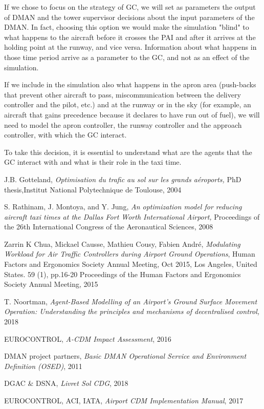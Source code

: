 \documentclass{article}
\begin{document}
If we chose to focus on the strategy of GC, we will set as parameters the output of DMAN and the tower supervisor decisions about the input parameters of the DMAN. 
In fact, choosing this option we would make the simulation "blind" to what happens to the aircraft before it crosses the PAI and after it arrives at the holding point at the runway, and vice versa. Information about what happens in those time period arrive as a parameter to the GC, and not as an effect of the simulation. 

If we include in the simulation also what happens in the apron area (push-backs that prevent other aircraft to pass, miscommunication between the delivery controller and the pilot, etc.) and at the runway or in the sky (for example, an aircraft that gains precedence because it declares to have run out of fuel), we will need to model the apron controller, the runway controller and the approach controller, with which the GC interact. 

To take this decision, it is essential to understand what are the agents that the GC interact with and what is their role in the taxi time.



\begin{thebibliography}{9}
	
	J.B. Gotteland,
	\textit{Optimisation du trafic au sol sur les grands aéroports,}
	PhD thesis,Institut National Polytechnique de Toulouse, 
	2004
	
	S. Rathinam, J. Montoya, and Y. Jung, 
	\textit{An optimization model for reducing aircraft taxi times at the Dallas Fort Worth International Airport,}
	Proceedings of the 26th International Congress of the Aeronautical Sciences, 
	2008
	
	Zarrin  K  Chua,  Mickael  Causse,  Mathieu  Cousy, Fabien  André,
	\textit{Modulating   Workload   for   Air   Traffic   Controllers   during   Airport Ground  Operations},
	Human  Factors  and  Ergonomics  Society Annual Meeting,  Oct  2015,  Los  Angeles,  United  States.  59  (1),  pp.16-20 Proceedings  of  the  Human  Factors  and  Ergonomics  Society  Annual Meeting, 
	2015
	
	T. Noortman,
	\textit{Agent-Based Modelling of an Airport’s Ground Surface Movement Operation: Understanding the principles and mechanisms of decentralised control,}
	2018
	
	EUROCONTROL,
	\textit{A-CDM Impact Assessment}, 
	2016
	
	DMAN project partners,
	\textit{Basic DMAN Operational Service and Environment Definition (OSED)},
	2011
	
	DGAC \& DSNA,
	\textit{Livret Sol CDG},
	2018
	
	EUROCONTROL, ACI, IATA,
	\textit{Airport CDM Implementation Manual},
	2017
\end{thebibliography}
	
	
\end{document}
